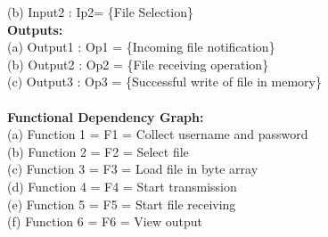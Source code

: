 \documentclass[11pt,a4paper]{report}
\begin{document}
(b)	Input2 : Ip2= \{File Selection\}\\
\newline
\textbf{Outputs:\\}
(a)	Output1 : Op1 = \{Incoming file notification\}\\
(b)	Output2 : Op2 = \{File receiving operation\}\\
(c) Output3 : Op3 = \{Successful write of file in memory\}\\
\textbf{\\Functional Dependency Graph:\\}
(a)	Function 1 = F1 = Collect username and password\\
(b)	Function 2 = F2 = Select file \\
(c)	Function 3 = F3 = Load file in byte array\\
(d)	Function 4 = F4 = Start transmission\\
(e)	Function 5 = F5 = Start file receiving\\
(f)	Function 6 = F6 = View output\\
\end{document}
